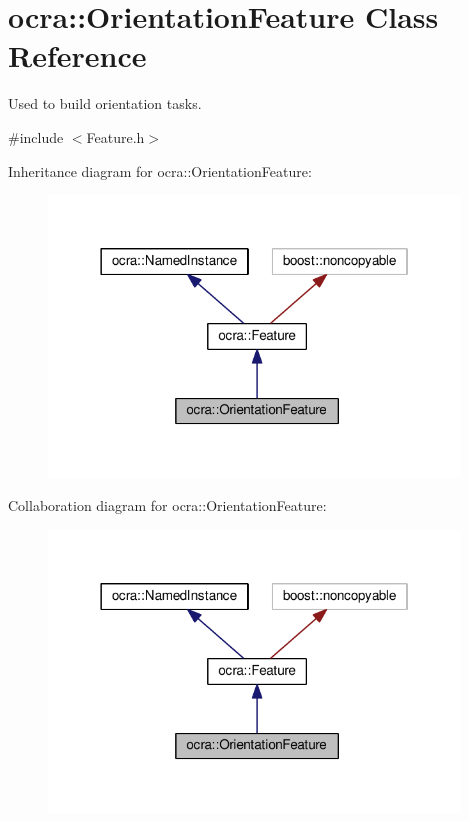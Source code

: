 \hypertarget{classocra_1_1OrientationFeature}{}\section{ocra\+:\+:Orientation\+Feature Class Reference}
\label{classocra_1_1OrientationFeature}


Used to build orientation tasks.  




{\ttfamily \#include $<$Feature.\+h$>$}



Inheritance diagram for ocra\+:\+:Orientation\+Feature\+:
\nopagebreak
\begin{figure}[H]
\begin{center}
\leavevmode
\includegraphics[width=310pt]{d8/d0b/classocra_1_1OrientationFeature__inherit__graph}
\end{center}
\end{figure}


Collaboration diagram for ocra\+:\+:Orientation\+Feature\+:
\nopagebreak
\begin{figure}[H]
\begin{center}
\leavevmode
\includegraphics[width=310pt]{d4/df2/classocra_1_1OrientationFeature__coll__graph}
\end{center}
\end{figure}
